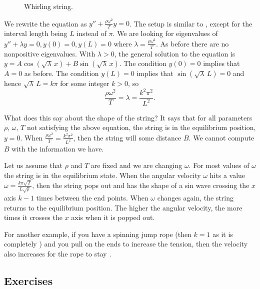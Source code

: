 \begin{figure}[h!t]
\capstart
\begin{center}
\caption{Whirling string.\label{bvp:whirstringfig}}
\end{center}
\end{figure}

We rewrite the equation as
$y'' + \frac{\rho \omega^2}{T} y = 0$.
The setup is similar to , except for the
interval length being $L$ instead of $\pi$.  We are looking for eigenvalues
of $y'' + \lambda y = 0, y(0) = 0, y(L) = 0$ where
$\lambda = \frac{\rho \omega^2}{T}$.  As before
there are no nonpositive eigenvalues.  With $\lambda > 0$,
the general solution to the equation is $y = A \cos ( \! \sqrt{\lambda} \,x ) + B
\sin ( \! \sqrt{\lambda} \,x )$.  The condition $y(0) = 0$ implies that $A = 0$ as
before.  The condition $y(L) = 0$ implies that
$\sin ( \! \sqrt{\lambda} \, L) = 0$ and hence
$\sqrt{\lambda} \, L = k \pi$  for some integer $k > 0$, so
\begin{equation*}
\frac{\rho \omega^2}{T} = \lambda = \frac{k^2 \pi^2}{L^2} .
\end{equation*}

What does this say about the shape of the string?  It says that for
all parameters $\rho$, $\omega$, $T$ not satisfying the above equation, the
string is in the equilibrium position, $y=0$.  When 
$\frac{\rho \omega^2}{T} = \frac{k^2 \pi^2}{L^2}$, then the string will
 some distance $B$.  We cannot compute $B$
with the information we have.

Let us assume that $\rho$ and $T$ are fixed and we are changing $\omega$.
For most values of $\omega$ the string is in the equilibrium state.  When 
the angular velocity $\omega$ hits a value
$\omega = \frac{k \pi \sqrt{T}}{L\sqrt{\rho}}$, then the string 
pops out and has the shape of a sin wave crossing the
$x$ axis $k-1$ times between the end points.  When $\omega$ changes again, the string returns to
the equilibrium position.  The higher the angular velocity,
the more times it crosses the $x$ axis when it is popped out.

For another example, if you have a spinning jump rope (then $k=1$ as it is
completely ) and you
pull on the ends to increase the tension, then the velocity also increases
for the rope to stay .


\subsection{Exercises}

